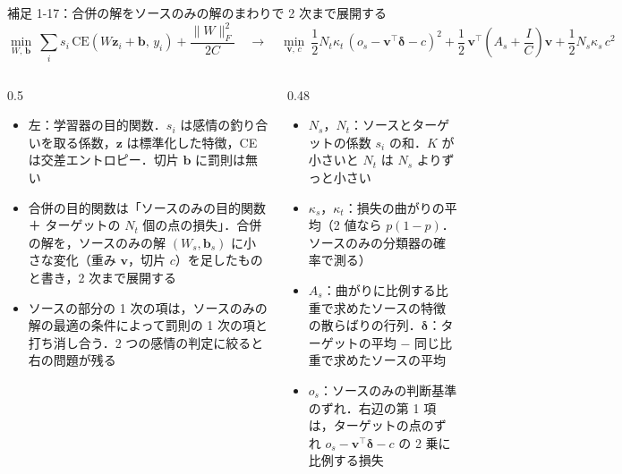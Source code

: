 \begin{frame}{補足 1-17：合併の解をソースのみの解のまわりで 2 次まで展開する}
  \label{s:p1:lam}
  \vspace{-0.1em}
  {\tighteq\small
  \[ \min_{W,\,\mathbf{b}}\ \sum_{i} s_i\,\mathrm{CE}(W\mathbf{z}_i + \mathbf{b},\,y_i) + \frac{\|W\|_F^2}{2C}
     \quad\longrightarrow\quad
     \min_{\mathbf{v},\,c}\ \frac12 N_t\kappa_t\,(o_s - \mathbf{v}^{\top}\boldsymbol{\delta} - c)^2 + \frac12\,\mathbf{v}^{\top}\!\left(A_s + \frac IC\right)\!\mathbf{v} + \frac12 N_s\kappa_s\,c^2 \]}
  \vspace{-0.2em}
  \begin{columns}[T,onlytextwidth]
    \begin{column}{0.5\textwidth}
      \begin{itemize}\scriptsize\setlength{\itemsep}{4pt}
        \item 左：学習器の目的関数．$s_i$ は感情の釣り合いを取る係数，$\mathbf z$ は標準化した特徴，CE は交差エントロピー．切片 $\mathbf b$ に罰則は無い
        \item 合併の目的関数は「ソースのみの目的関数 ＋ ターゲットの $N_t$ 個の点の損失」．合併の解を，ソースのみの解 $(W_s, \mathbf b_s)$ に小さな変化（重み $\mathbf v$，切片 $c$）を足したものと書き，2 次まで展開する
        \item ソースの部分の 1 次の項は，ソースのみの解の最適の条件によって罰則の 1 次の項と打ち消し合う．2 つの感情の判定に絞ると右の問題が残る
      \end{itemize}
    \end{column}
    \begin{column}{0.48\textwidth}
      \begin{itemize}\scriptsize\setlength{\itemsep}{4pt}
        \item $N_s$，$N_t$：ソースとターゲットの係数 $s_i$ の和．$K$ が小さいと $N_t$ は $N_s$ よりずっと小さい
        \item $\kappa_s$，$\kappa_t$：損失の曲がりの平均（2 値なら $p(1-p)$．ソースのみの分類器の確率で測る）
        \item $A_s$：曲がりに比例する比重で求めたソースの特徴の散らばりの行列．$\boldsymbol\delta$：ターゲットの平均 − 同じ比重で求めたソースの平均
        \item $o_s$：ソースのみの判断基準のずれ．右辺の第 1 項は，ターゲットの点のずれ $o_s - \mathbf v^{\top}\boldsymbol\delta - c$ の 2 乗に比例する損失
      \end{itemize}
    \end{column}
  \end{columns}
\end{frame}

